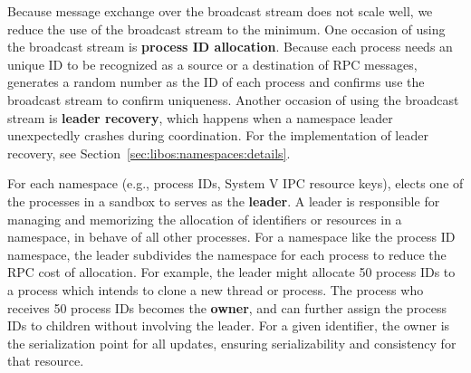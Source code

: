 Because message exchange over the broadcast stream does not scale well,
we reduce the use of the broadcast stream to the minimum.
One occasion of using the broadcast stream is
{\bf process ID allocation}.
Because each process needs an unique ID to be recognized as a source or a destination of RPC messages, \thelibos{} generates a random number as the ID of each process and confirms use the broadcast stream to confirm uniqueness.
Another occasion of using the broadcast stream
is {\bf leader recovery}, which happens when a namespace leader unexpectedly crashes
during coordination. For the implementation of leader recovery, see Section~\ref{sec:libos:namespaces:details}.


For each namespace (e.g., process IDs, System V IPC resource keys), \thelibos{} elects one of the processes in a sandbox to serves as the {\bf leader}.
A leader is responsible for
managing and memorizing the allocation of identifiers or resources in a namespace,
in behave of all other processes.
For a namespace like the process ID namespace,
the leader subdivides the namespace for each process to reduce the RPC cost of allocation.
For example, the leader might allocate 50 process IDs to a process which intends to clone a new thread or process.
The process who receives 50 process IDs becomes the {\bf owner},
and can further assign the process IDs
to children without involving the leader.
For a given identifier, the owner is the serialization point for all updates,
ensuring serializability and consistency for that resource.

\label{sec:libos:namespaces:details}

